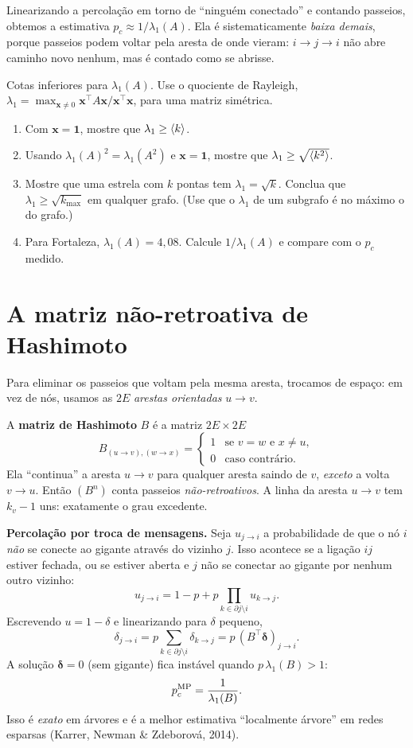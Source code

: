\documentclass[11pt]{article}
\begin{document}
\begin{ideia}
Linearizando a percolação em torno de ``ninguém conectado'' e contando passeios, obtemos a estimativa $p_c\approx 1/\lambda_1(A)$. Ela é sistematicamente \emph{baixa demais}, porque passeios podem voltar pela aresta de onde vieram: $i\to j\to i$ não abre caminho novo nenhum, mas é contado como se abrisse.
\end{ideia}

 Cotas inferiores para $\lambda_1(A)$. Use o quociente de Rayleigh, $\lambda_1 = \max_{\bm x\ne0}\bm x^{\!\top}\!A\bm x/\bm x^{\!\top}\bm x$, para uma matriz simétrica.
\begin{enumerate}
  \item Com $\bm x=\bm 1$, mostre que $\lambda_1\ge\left\langle k \right\rangle$.
  \item Usando $\lambda_1(A)^2 = \lambda_1(A^2)$ e $\bm x = \bm 1$, mostre que $\lambda_1\ge\sqrt{\left\langle k^2 \right\rangle}$.
  \item Mostre que uma estrela com $k$ pontas tem $\lambda_1 = \sqrt k$. Conclua que $\lambda_1\ge\sqrt{k_{\max}}$ em qualquer grafo. (Use que o $\lambda_1$ de um subgrafo é no máximo o do grafo.)
  \item Para Fortaleza, $\lambda_1(A) = 4{,}08$. Calcule $1/\lambda_1(A)$ e compare com o $p_c$ medido.
\end{enumerate}

\section{A matriz não-retroativa de Hashimoto}

Para eliminar os passeios que voltam pela mesma aresta, trocamos de espaço: em vez de nós, usamos as $2E$ \emph{arestas orientadas} $u\to v$.

\begin{ideia}
A \textbf{matriz de Hashimoto} $B$ é a matriz $2E\times2E$
\[
B_{(u\to v),(w\to x)} = \begin{cases} 1 & \text{se } v = w \text{ e } x\ne u,\\ 0 & \text{caso contrário.}\end{cases}
\]
Ela ``continua'' a aresta $u\to v$ para qualquer aresta saindo de $v$, \emph{exceto} a volta $v\to u$. Então $(B^n)$ conta passeios \emph{não-retroativos}. A linha da aresta $u\to v$ tem $k_v - 1$ uns: exatamente o grau excedente.
\end{ideia}

\textbf{Percolação por troca de mensagens.} Seja $u_{j\to i}$ a probabilidade de que o nó $i$ \emph{não} se conecte ao gigante através do vizinho $j$. Isso acontece se a ligação $ij$ estiver fechada, ou se estiver aberta e $j$ não se conectar ao gigante por nenhum outro vizinho:
\[
u_{j\to i} = 1-p+p\prod_{k\in\partial j\setminus i} u_{k\to j}.
\]
Escrevendo $u = 1-\delta$ e linearizando para $\delta$ pequeno,
\[
\delta_{j\to i} = p\sum_{k\in\partial j\setminus i}\delta_{k\to j} = p\,(B^{\!\top}\bm\delta)_{j\to i}.
\]
A solução $\bm\delta=0$ (sem gigante) fica instável quando $p\,\lambda_1(B)>1$:
\[
p_c^{\rm MP} = \frac{1}{\lambda_1(B)}.
\]
Isso é \emph{exato} em árvores e é a melhor estimativa ``localmente árvore'' em redes esparsas (Karrer, Newman \& Zdeborová, 2014).
\end{document}
